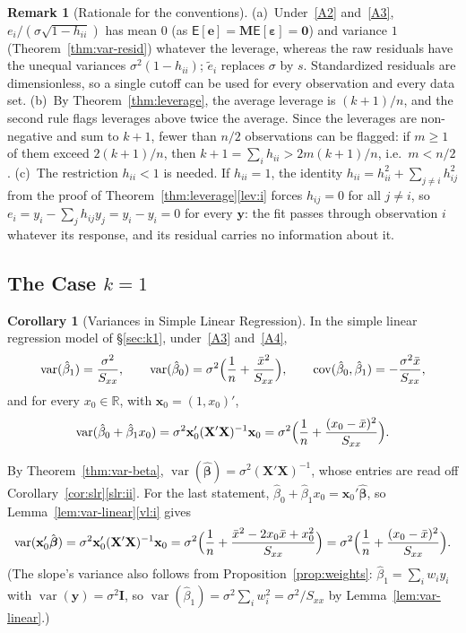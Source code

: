 \documentclass[12pt,a4paper]{article}
\makeatletter
\theoremstyle{definition}
\newtheorem{corollary}[theorem]{Corollary}
\newtheorem{remark}[theorem]{Remark}
\renewenvironment{proof}[1][\proofname]{\par
  \pushQED{\qed}%
  \normalfont \topsep6\p@\@plus6\p@\relax
  \trivlist
  \item[\hskip\labelsep\bfseries #1\@addpunct{.}]\ignorespaces
}{%
  \popQED\endtrivlist\@endpefalse
}
\newcommand\expc{\mathsf{E}}
\DeclareMathOperator\var{var}
\DeclareMathOperator\cov{cov}
\newcommand{\bX}{\mathbf{X}}
\newcommand{\by}{\mathbf{y}}
\newcommand{\bx}{\mathbf{x}}
\def\bb{\boldsymbol{\beta}}
\newcommand{\be}{\boldsymbol{\varepsilon}}
\newcommand{\bI}{\mathbf{I}}
\newcommand{\bM}{\mathbf{M}}
\newcommand{\bzero}{\mathbf{0}}
\newcommand{\Real}{\mathbb{R}}
\makeatother
\begin{document}
\begin{remark}[Rationale for the conventions]\label{rem:std-resid}
(a)~Under~\ref{A2} and~\ref{A3}, $e_i/(\sigma\sqrt{1 - h_{ii}})$ has mean $0$ (as $\expc[\mathbf{e}] = \bM\expc[\be] = \bzero$) and variance $1$ (Theorem~\ref{thm:var-resid}) whatever the leverage, whereas the raw residuals have the unequal variances $\sigma^2(1 - h_{ii})$; $\tilde e_i$ replaces $\sigma$ by $s$. Standardized residuals are dimensionless, so a single cutoff can be used for every observation and every data set. (b)~By Theorem~\ref{thm:leverage}, the average leverage is $(k+1)/n$, and the second rule flags leverages above twice the average. Since the leverages are non-negative and sum to $k + 1$, fewer than $n/2$ observations can be flagged: if $m \geqslant 1$ of them exceed $2(k+1)/n$, then $k + 1 = \sum_i h_{ii} > 2m(k+1)/n$, i.e.\ $m < n/2$. (c)~The restriction $h_{ii} < 1$ is needed. If $h_{ii} = 1$, the identity $h_{ii} = h_{ii}^2 + \sum_{j \neq i}h_{ij}^2$ from the proof of Theorem~\ref{thm:leverage}\ref{lev:i} forces $h_{ij} = 0$ for all $j \neq i$, so $e_i = y_i - \sum_j h_{ij}y_j = y_i - y_i = 0$ for every $\by$: the fit passes through observation $i$ whatever its response, and its residual carries no information about it.
\end{remark}

\subsection{The Case \texorpdfstring{$k = 1$}{k = 1}}

\begin{corollary}[Variances in Simple Linear Regression]\label{cor:slr-var}
In the simple linear regression model of \S\ref{sec:k1}, under~\ref{A3} and~\ref{A4},
\[
\var(\hat\beta_1) = \frac{\sigma^2}{S_{xx}}, \qquad \var(\hat\beta_0) = \sigma^2\Bigl(\frac{1}{n} + \frac{\bar x^2}{S_{xx}}\Bigr), \qquad \cov(\hat\beta_0, \hat\beta_1) = -\frac{\sigma^2\bar x}{S_{xx}},
\]
and for every $x_0 \in \Real$, with $\bx_0 = (1, x_0)'$,
\[
\var(\hat\beta_0 + \hat\beta_1x_0) = \sigma^2\bx_0'(\bX'\bX)^{-1}\bx_0 = \sigma^2\Bigl(\frac{1}{n} + \frac{(x_0 - \bar x)^2}{S_{xx}}\Bigr).
\]
\end{corollary}

\begin{proof}
By Theorem~\ref{thm:var-beta}, $\var(\hat{\bb}) = \sigma^2(\bX'\bX)^{-1}$, whose entries are read off Corollary~\ref{cor:slr}\ref{slr:ii}. For the last statement, $\hat\beta_0 + \hat\beta_1x_0 = \bx_0'\hat{\bb}$, so Lemma~\ref{lem:var-linear}\ref{vl:i} gives
\[
\var(\bx_0'\hat{\bb}) = \sigma^2\bx_0'(\bX'\bX)^{-1}\bx_0 = \sigma^2\Bigl(\frac{1}{n} + \frac{\bar x^2 - 2x_0\bar x + x_0^2}{S_{xx}}\Bigr) = \sigma^2\Bigl(\frac{1}{n} + \frac{(x_0 - \bar x)^2}{S_{xx}}\Bigr).
\]
(The slope's variance also follows from Proposition~\ref{prop:weights}: $\hat\beta_1 = \sum_i w_iy_i$ with $\var(\by) = \sigma^2\bI$, so $\var(\hat\beta_1) = \sigma^2\sum_i w_i^2 = \sigma^2/S_{xx}$ by Lemma~\ref{lem:var-linear}.)
\end{proof}
\end{document}
